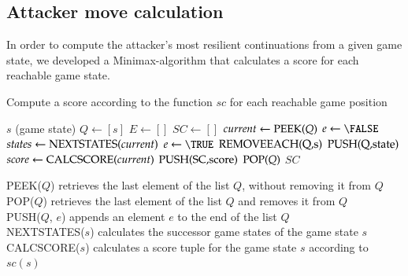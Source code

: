 \documentclass[a4paper,american,10pt]{paper}
\theoremstyle{definition}\newtheorem{definition}{Definition}
\begin{document}
\subsection{Attacker move calculation}
In order to compute the attacker's most resilient continuations from a given game state, we developed a Minimax-algorithm that calculates a score for each reachable game state.
\begin{algorithm}[H]
\caption{Compute a score according to the function $sc$ for each reachable game position}\label{alg:minimax}
\begin{algorithmic}[1]
\Require $s$ (game state)
	\State $Q \gets [s]$
	\State $E \gets []$
	\State $SC \gets []$
		\State $current \gets \Call{PEEK}{Q}$
		\State $e \gets \FALSE$
		\State $states \gets \Call{NEXTSTATES}{current}$
			\State {}
			\State $e \gets \TRUE$
						\State $\Call{REMOVEEACH}{$Q$, $s$}$
					\EndIf
					\State $\Call{PUSH}{$Q$, $state$}$
				\EndIf
			\EndFor
		\EndIf
			\State $score \gets \Call{CALCSCORE}{current}$
			\State $\Call{PUSH}{$SC$, $score$}$
			\State $\Call{POP}{Q}$
		\EndIf
	\EndWhile
	\State \Return $SC$
\EndFunction
\end{algorithmic}
PEEK($Q$) retrieves the last element of the list $Q$, without removing it from $Q$\\
POP($Q$) retrieves the last element of the list $Q$ and removes it from $Q$\\
PUSH($Q$, $e$) appends an element $e$ to the end of the list $Q$\\
NEXTSTATES($s$) calculates the successor game states of the game state $s$\\
CALCSCORE($s$) calculates a score tuple for the game state $s$ according to $sc(s)$
\end{algorithm}
\end{document}
